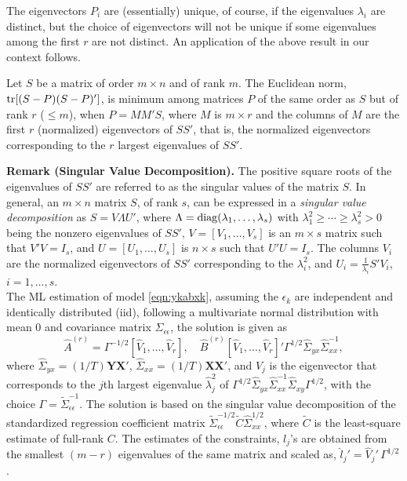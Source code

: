 The eigenvectors $P_i$ are (essentially) unique, of course, if the eigenvalues $\lambda_i$ are distinct, but the choice of eigenvectors will not be unique if some eigenvalues among the first $r$ are not distinct. An application of the above result in our context follows. 


\begin{result} \label{res:3} 
Let $S$ be a matrix of order $m \times n$ and of rank $m$. The Euclidean norm, $\operatorname{tr}[(S-P)(S-P)']$, is minimum among matrices $P$ of the same order  as $S$ but of rank $r$ ($\leq m$), when $P= MM'S$, where $M$ is $m \times r$ and the columns of $M$ are the first $r$ (normalized) eigenvectors of $SS'$, that is, the normalized eigenvectors corresponding to the $r$ largest eigenvalues of $SS'$. 
\end{result}


\noindent\textbf{Remark (Singular Value Decomposition).} The positive square roots of the eigenvalues of $SS'$ are referred to as the singular values of the matrix $S$. In general, an $m \times n$ matrix $S$, of rank $s$, can be expressed in a \emph{singular value decomposition} as $S= V \Lambda U'$, where $\Lambda= \operatorname{diag}(\lambda_1, \ldots, \lambda_s)$ with $\lambda_1^2 \geq \cdots \geq \lambda_s^2 > 0$ being the nonzero eigenvalues of $SS'$, $V= [V_1, \ldots, V_s]$ is an $m \times s$ matrix such that $V' V= I_s$, and $U= [U_1, \ldots, U_s]$ is $n \times s$ such that $U'U= I_s$. The columns $V_i$ are the normalized eigenvectors of $SS'$ corresponding to the $\lambda_i^2$, and $U_i= \frac{1}{\lambda_i}S'V_i$, $i=1, \ldots, s$. \\


The ML estimation of model \eqref{eqn:ykabxk}, assuming the $\epsilon_k$ are independent and identically distributed (iid), following a multivariate normal distribution with mean 0 and covariance matrix $\Sigma_{\epsilon\epsilon}$, the solution is given as 
	\begin{equation} \label{eqn:covarmatrixsol}
	\hat{A}^{(r)}= \Gamma^{-1/2} [\hat{V}_1, \ldots, \hat{V}_r], \quad \hat{B}^{(r)}[ \hat{V}_1, \ldots, \hat{V}_r]' \Gamma^{1/2} \hat{\Sigma}_{yx} \hat{\Sigma}_{xx}^{-1},
	\end{equation}
where $\hat{\Sigma}_{yx}= (1/T) \mathbf{Y} \mathbf{X}'$, $\hat{\Sigma}_{xx}= (1/T) \mathbf{X} \mathbf{X}'$, and $\hat{V}_j$ is the eigenvector that corresponds to the $j$th largest eigenvalue $\hat{\lambda}_j^2$ of $\Gamma^{1/2} \hat{\Sigma}_{yx} \hat{\Sigma}_{xx}^{-1} \hat{\Sigma}_{xy}\Gamma^{1/2}$, with the choice $\Gamma= \tilde{\Sigma}_{\epsilon\epsilon}^{-1}$. The solution is based on the singular value decomposition of the standardized regression coefficient matrix $\tilde{\Sigma}_{\epsilon\epsilon}^{-1/2} \tilde{C} \hat{\Sigma}_{xx}^{1/2}$, where $\tilde{C}$ is the least-square estimate of full-rank $C$. The estimates of the constraints, $l_j$'s are obtained from the smallest $(m-r)$ eigenvalues of the same matrix and scaled as, $\hat{l}_j' = \hat{V}_j' \, \Gamma^{1/2}$. 


